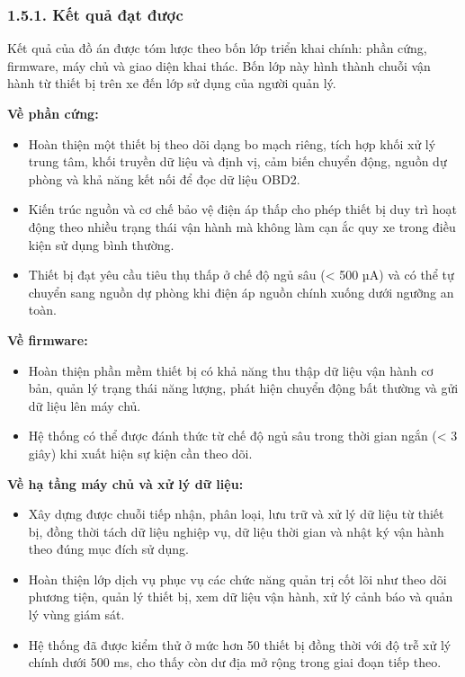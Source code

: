 \documentclass[a4paper]{extarticle}
\providecommand{\tightlist}{%
  \setlength{\itemsep}{0pt}\setlength{\parskip}{0pt}}
\begin{document}
\subsubsection{1.5.1. Kết quả đạt được}\label{kux1ebft-quux1ea3-ux111ux1ea1t-ux111ux1b0ux1ee3c}

Kết quả của đồ án được tóm lược theo bốn lớp triển khai chính: phần
cứng, firmware, máy chủ và giao diện khai thác. Bốn lớp này hình thành
chuỗi vận hành từ thiết bị trên xe đến lớp sử dụng của người quản lý.

\textbf{Về phần cứng:}

\begin{itemize}
\tightlist
\item
  Hoàn thiện một thiết bị theo dõi dạng bo mạch riêng, tích hợp khối xử
  lý trung tâm, khối truyền dữ liệu và định vị, cảm biến chuyển động,
  nguồn dự phòng và khả năng kết nối để đọc dữ liệu OBD2.
\item
  Kiến trúc nguồn và cơ chế bảo vệ điện áp thấp cho phép thiết bị duy trì
  hoạt động theo nhiều trạng thái vận hành mà không làm cạn ắc quy xe
  trong điều kiện sử dụng bình thường.
\item
  Thiết bị đạt yêu cầu tiêu thụ thấp ở chế độ ngủ sâu (\textless{} 500 µA) và có
  thể tự chuyển sang nguồn dự phòng khi điện áp nguồn chính xuống dưới
  ngưỡng an toàn.
\end{itemize}

\textbf{Về firmware:}

\begin{itemize}
\tightlist
\item
  Hoàn thiện phần mềm thiết bị có khả năng thu thập dữ liệu vận hành cơ
  bản, quản lý trạng thái năng lượng, phát hiện chuyển động bất thường và
  gửi dữ liệu lên máy chủ.
\item
  Hệ thống có thể được đánh thức từ chế độ ngủ sâu trong thời gian ngắn
  (\textless{} 3 giây) khi xuất hiện sự kiện cần theo dõi.
\end{itemize}

\textbf{Về hạ tầng máy chủ và xử lý dữ liệu:}

\begin{itemize}
\tightlist
\item
  Xây dựng được chuỗi tiếp nhận, phân loại, lưu trữ và xử lý dữ liệu từ
  thiết bị, đồng thời tách dữ liệu nghiệp vụ, dữ liệu thời gian và nhật
  ký vận hành theo đúng mục đích sử dụng.
\item
  Hoàn thiện lớp dịch vụ phục vụ các chức năng quản trị cốt lõi như theo
  dõi phương tiện, quản lý thiết bị, xem dữ liệu vận hành, xử lý cảnh báo
  và quản lý vùng giám sát.
\item
  Hệ thống đã được kiểm thử ở mức hơn 50 thiết bị đồng thời với độ trễ xử
  lý chính dưới 500 ms, cho thấy còn dư địa mở rộng trong giai đoạn tiếp
  theo.
\end{itemize}
\end{document}
